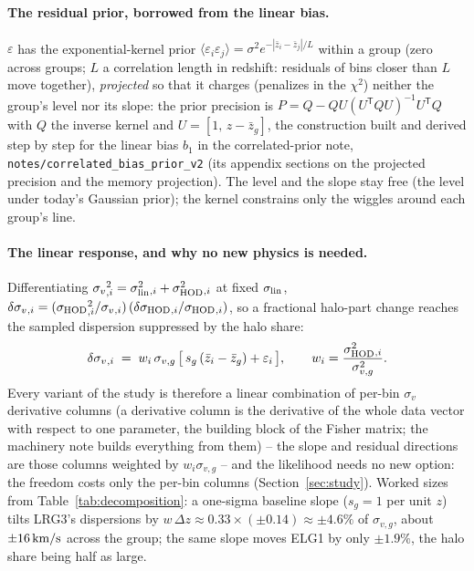 \documentclass[11pt]{article}
\newcommand{\sv}{\sigma_v}
\newcommand{\svg}{\sigma_{v,g}}
\newcommand{\slin}{\sigma_{\rm lin}}
\newcommand{\shod}{\sigma_{\rm HOD}}
\newcommand{\kms}{\,{\rm km/s}}
\newcommand{\us}{\_\allowbreak}
\begin{document}
\paragraph{The residual prior, borrowed from the linear bias.}
$\varepsilon$ has the exponential-kernel prior
$\langle\varepsilon_i\varepsilon_j\rangle = \sigma^2
e^{-|\bar{z}_i - \bar{z}_j|/L}$ within a group (zero across groups;
$L$ a correlation length in redshift: residuals of bins closer than
$L$ move together),
\emph{projected} so that it charges (penalizes in the $\chi^2$)
neither the group's level nor its
slope: the prior precision is
$P = Q - QU(U^{\mathsf T}QU)^{-1}U^{\mathsf T}Q$ with $Q$ the inverse
kernel and $U = [1,\, z - \bar{z}_g]$, the construction built and
derived step by step for the linear bias $b_1$ in the correlated-prior
note, \texttt{notes/correlated\us bias\us prior\us v2} (its appendix
sections on the projected precision and the memory projection).  The
level and the slope stay free (the level under today's Gaussian
prior); the kernel constrains only the wiggles around each group's
line.

\paragraph{The linear response, and why no new physics is needed.}
Differentiating $\sv{}_{,i}^2 = \slin^2{}_{,i} + \shod^2{}_{,i}$ at
fixed $\slin$,
$\delta\sv{}_{,i} = (\shod{}_{,i}^2/\sv{}_{,i})\,
(\delta\shod{}_{,i}/\shod{}_{,i})$, so a fractional halo-part change
reaches the sampled dispersion suppressed by the halo share:
\begin{equation}
  \delta\sv{}_{,i} \;=\; w_i\,\svg\,
  \bigl[\,s_g\,(\bar{z}_i - \bar{z}_g) + \varepsilon_i\,\bigr] ,
  \qquad
  w_i = \frac{\shod^2{}_{,i}}{\svg^2} .
  \label{eq:response}
\end{equation}
Every variant of the study is therefore a linear combination of
per-bin $\sv$ derivative columns (a derivative column is the
derivative of the whole data vector with respect to one parameter, the
building block of the Fisher matrix; the machinery note builds
everything from them) -- the slope and residual directions
are those columns weighted by $w_i\svg$ -- and the likelihood needs
no new option: the freedom costs only the per-bin columns
(Section~\ref{sec:study}).  Worked sizes from
Table~\ref{tab:decomposition}: a one-sigma baseline slope
($s_g = 1$ per unit $z$) tilts LRG3's dispersions by
$w\,\Delta z \approx 0.33 \times (\pm 0.14) \approx \pm 4.6\%$ of
$\svg$, about $\pm 16\kms$ across the group; the same slope moves
ELG1 by only $\pm 1.9\%$, the halo share being half as large.
\end{document}
